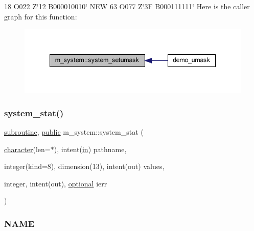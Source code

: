 18 O\textquotesingle{}022\textquotesingle{} Z\char`\"{}12\textquotesingle{} B\textquotesingle{}000010010\char`\"{} N\+EW 63 O\textquotesingle{}077\textquotesingle{} Z\char`\"{}3\+F\textquotesingle{} B\textquotesingle{}000111111\char`\"{} Here is the caller graph for this function\+:
\nopagebreak
\begin{figure}[H]
\begin{center}
\leavevmode
\includegraphics[width=340pt]{namespacem__system_a04fd02e6f5ce2f8ecdfb577e1490feba_icgraph}
\end{center}
\end{figure}
\mbox{\label{namespacem__system_a5bb1ebcebe181e07fd24e908cacc9887}} 
\subsubsection{\texorpdfstring{system\+\_\+stat()}{system\_stat()}}
{\footnotesize\ttfamily \hyperlink{M__stopwatch_83_8txt_acfbcff50169d691ff02d4a123ed70482}{subroutine}, \hyperlink{M__stopwatch_83_8txt_a2f74811300c361e53b430611a7d1769f}{public} m\+\_\+system\+::system\+\_\+stat (\begin{DoxyParamCaption}\item[{\hyperlink{option__stopwatch_83_8txt_abd4b21fbbd175834027b5224bfe97e66}{character}(len=$\ast$), intent(\hyperlink{M__journal_83_8txt_afce72651d1eed785a2132bee863b2f38}{in})}]{pathname,  }\item[{integer(kind=8), dimension(13), intent(out)}]{values,  }\item[{integer, intent(out), \hyperlink{option__stopwatch_83_8txt_aa4ece75e7acf58a4843f70fe18c3ade5}{optional}}]{ierr }\end{DoxyParamCaption})}



\subsubsection*{N\+A\+ME}

